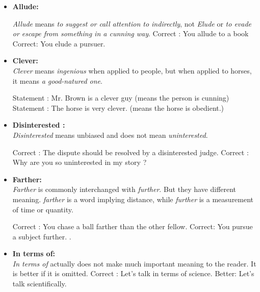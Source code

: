 \documentclass{report}
\begin{document}
\begin{itemize}
    \item
    \textbf{\Large{Allude:}}
    
    \textit{Allude} means \textit{to suggest or call attention to indirectly}, not \textit{Elude} or \textit{to evade or escape from something in a cunning way}.
    \DoubleRowSingleCol
    {Correct : You allude to a book}
    {Correct: You elude a pursuer.}
    
    \bigskip
    
    \item
    \textbf{\Large{Clever:}}\\
    \textit{Clever} means \textit{ingenious} when applied to people, but when applied to horses, it means \textit{a good-natured one}.
    
    \DoubleRowSingleCol
    {Statement : Mr. Brown is a clever guy (means the person is cunning)}
    {Statement : The horse is very clever. (means the horse is obedient.)}
    \bigskip

    \item
    \textbf{\Large{Disinterested :}}\\
    \textit{Disinterested} means unbiased and does not mean \textit{uninterested}.
    
    \DoubleRowSingleCol
    {Correct : The dispute should be resolved by a disinterested judge.}
    {Correct : Why are you so uninterested in my story ?}
     
    \newpage
    
    \item
    \textbf{\Large{Farther:}}\\
    
    \textit{Farther} is commonly interchanged with \textit{further}. But they have different meaning. \textit{farther} is a word implying distance, while \textit{further} is a measurement of time or quantity.
    
    \DoubleRowSingleCol
    {Correct : You chase a ball farther than the other fellow.}
    {Correct: You pursue a subject further.}
        .
    \item
    \textbf{\Large{In terms of:}}\\
    
    \textit{In terms of} actually does not make much important meaning to the reader. It is better if it is omitted.
    \DoubleRowSingleCol
    {Correct : Let's talk in terms of science.}
    {Better: Let's talk scientifically.}
    \bigskip


\end{itemize}
\end{document}
